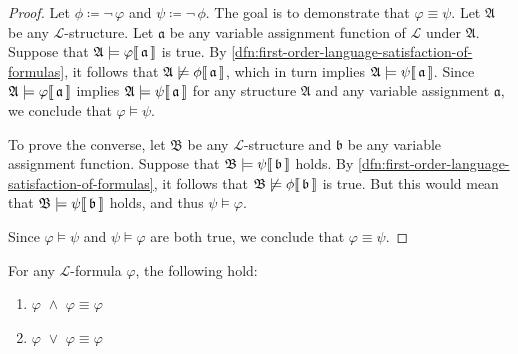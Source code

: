 \begin{proof}
    Let \( \phi \coloneq \lnot \, \varphi \) and \( \psi \coloneq \lnot \, \phi \).
    The goal is to demonstrate that \( \varphi \equiv \psi \).
    Let \( \mathfrak{A} \) be any \( \mathcal{L} \)-structure. Let \( \mathfrak{a} \) be any variable assignment function of \( \mathcal{L} \) under \( \mathfrak{A} \).
    Suppose that \(  \mathfrak{A} \models \varphi\llbracket\, \mathfrak{a} \,\rrbracket \) is true. By \cref{dfn:first-order-language-satisfaction-of-formulas},
    it follows that \(  \mathfrak{A} \not\models \phi\llbracket\,\mathfrak{a} \,\rrbracket \), which in turn implies
    \(  \mathfrak{A} \models \psi\llbracket\, \mathfrak{a} \,\rrbracket \).
    Since \(  \mathfrak{A} \models \varphi\llbracket\, \mathfrak{a} \,\rrbracket \) implies \(  \mathfrak{A} \models \psi\llbracket\, \mathfrak{a} \,\rrbracket \) for any
    structure \( \mathfrak{A} \) and any variable assignment \( \mathfrak{a} \), we conclude that \( \varphi \models \psi \).

    \vspace{0.3cm}
    \noindent
    To prove the converse, let \( \mathfrak{B} \) be any \( \mathcal{L} \)-structure and \( \mathfrak{b} \) be any variable assignment function.
    Suppose that \(  \mathfrak{B} \models \psi\llbracket\, \mathfrak{b} \,\rrbracket \) holds.
    By \cref{dfn:first-order-language-satisfaction-of-formulas}, it follows that \(  \mathfrak{B} \not\models \phi\llbracket\,\mathfrak{b} \,\rrbracket \) is true.
    But this would mean that \(  \mathfrak{B} \models \psi\llbracket\, \mathfrak{b} \,\rrbracket \) holds, and thus \( \psi \models \varphi \).

    \vspace{0.3cm}
    \noindent
    Since \( \varphi \models \psi \) and \( \psi \models \varphi \) are both true, we conclude that \( \varphi \equiv \psi \).
\end{proof}

\begin{thm}[Idempotence]
     \label{logical-equivalence:idempotence-of-conjunctions-and-disjunctions}
    For any \( \mathcal{L} \)-formula \( \varphi \), the following hold:
    \begin{enumerate}[topsep=2pt,label=\textup{\texttt{(\alph*)}}]
        \item \( \varphi \,\,{\land}\,\, \varphi \equiv \varphi \)
        \item \( \varphi \,\,{\lor}\,\, \varphi \equiv \varphi \)
    \end{enumerate}
\end{thm}


